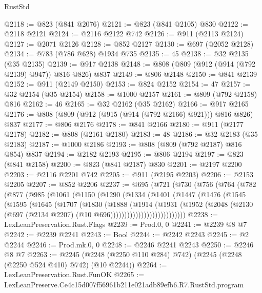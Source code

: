 \begin{lexlean}{RustStd}
\begin{coremodule}
@2118 := @823 (@841 @2076)
@2121 := @823 (@841 @2105) @830
@2122 := @2118 @2121
@2124 := @2116 @2122 @742
@2126 := @911 (@2113 @2124)
@2127 := @2071 @2126
@2128 := @852 @2127
@2130 := @697 (@2052 @2128)
@2134 := @783 (@786 @628) @1934 @735
@2135 := 45
@2138 := @32 @2135 (@35 @2135)
@2139 := @917 @2138
@2148 := @808 (@809 (@912 (@914 (@792 @2139) @947)) @816 @826) @837
@2149 := @806 @2148
@2150 := @841 @2139
@2152 := @911 (@2149 @2150)
@2153 := @824 @2152
@2154 := 47
@2157 := @32 @2154 (@35 @2154)
@2158 := @1000 @2157
@2161 := @809 (@792 @2158) @816
@2162 := 46
@2165 := @32 @2162 (@35 @2162)
@2166 := @917 @2165
@2176 := @808 (@809 (@912 (@915 (@914 (@792 @2166) @921))) @816 @826) @837
@2177 := @806 @2176
@2178 := @841 @2166
@2180 := @911 (@2177 @2178)
@2182 := @808 (@2161 @2180)
@2183 := 48
@2186 := @32 @2183 (@35 @2183)
@2187 := @1000 @2186
@2193 := @808 (@809 (@792 @2187) @816 @854) @837
@2194 := @2182 @2193
@2195 := @806 @2194
@2197 := @823 (@841 @2158)
@2200 := @823 (@841 @2187) @830
@2201 := @2197 @2200
@2203 := @2116 @2201 @742
@2205 := @911 (@2195 @2203)
@2206 := @2153 @2205
@2207 := @852 @2206
@2237 := @695
    (@721
      (@730
        (@756
          (@764
            (@782
              (@877
                (@985
                  (@1061
                    (@1150
                      (@1290
                        (@1334
                          (@1401
                            (@1447
                              (@1476
                                (@1545
                                  (@1595
                                    (@1645
                                      (@1707
                                        (@1830
                                          (@1888
                                            (@1914
                                              (@1931
                                                (@1952
                                                  (@2048
                                                    (@2130
                                                      (@697
                                                        (@2134 @2207)
                                                        (@10 @696)))))))))))))))))))))))))))
@2238 := LexLeanPreservation.Rust.Flags
@2239 := Prod.{0, 0}
@2241 := @2239 @8 @7
@2242 := @2239 @2241
@2243 := Bool
@2244 := @2242 @2243
@2245 := @2 @2244
@2246 := Prod.mk.{0, 0}
@2248 := @2246 @2241 @2243
@2250 := @2246 @8 @7
@2263 := @2245 (@2248 (@2250 @110 @284) @742) (@2245 (@2248 (@2250 @524 @410) @742) (@10 @2244))
@2264 := LexLeanPreservation.Rust.FunOK
@2265 := LexLeanPreserve.Ce4c15d007f56961b211e021adb89efb6.R7.RustStd.program

\end{coremodule}
\end{lexlean}
